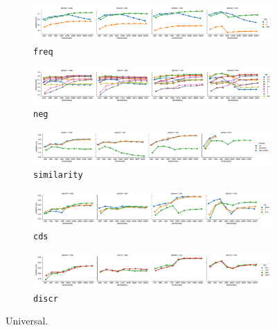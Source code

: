 \begin{figure}
  \centering

  \begin{subfigure}[t]{\textwidth}
    \includegraphics[width=1.1\textwidth]{supplement/figures/universal-interaction-freq}

  \caption{\texttt{freq}}
  \label{fig:universal-freq}
  \end{subfigure}

  \begin{subfigure}[t]{\textwidth}
    \includegraphics[width=1.1\textwidth]{supplement/figures/universal-interaction-neg}

  \caption{\texttt{neg}}
  \label{fig:universal-neg}
  \end{subfigure}

  \begin{subfigure}[t]{\textwidth}
  \includegraphics[width=1.1\textwidth]{supplement/figures/universal-interaction-similarity}

  \caption{\texttt{similarity}}
  \label{fig:universal-similarity}
  \end{subfigure}

  \begin{subfigure}[t]{\textwidth}
    \includegraphics[width=1.1\textwidth]{supplement/figures/universal-interaction-cds}

  \caption{\texttt{cds}}
  \label{fig:universal-cds}
  \end{subfigure}

  \begin{subfigure}[t]{\textwidth}
  \includegraphics[width=1.1\textwidth]{supplement/figures/universal-interaction-discr}

  \caption{\texttt{discr}}
  \label{fig:universal-discr}
  \end{subfigure}

  \caption{Universal.}
  \label{fig:universal-parameters}
\end{figure}
